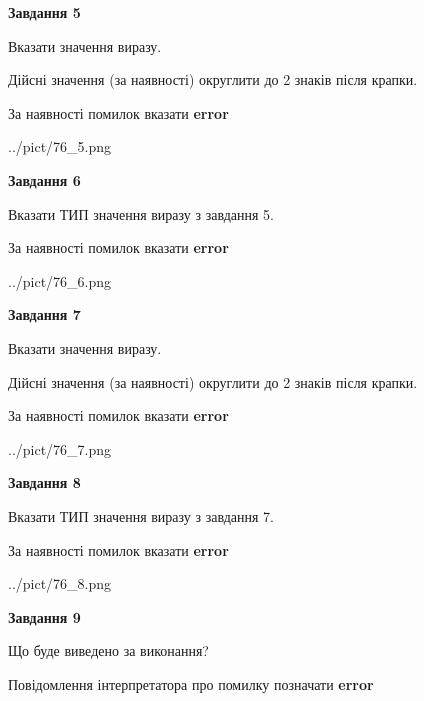 \documentclass[11pt, ukrainian]{article}
\begin{document}
{\begin {large}
{\begin {center}\textbf{Завдання 5}\end {center}}\par
Вказати значення виразу. \par
Дійсні значення (за наявності) округлити до 2 знаків після крапки. \par
За наявності помилок вказати \textbf{error}

\begin{center}
	{../pict/76_5.png}
\end{center}
\newpage

{\begin {center}\textbf{Завдання 6}\end {center}}\par
Вказати ТИП значення виразу з завдання 5. \par
За наявності помилок вказати \textbf{error}

\begin{center}
	{../pict/76_6.png}
\end{center}
\newpage

{\begin {center}\textbf{Завдання 7}\end {center}}\par
Вказати значення виразу. \par
Дійсні значення (за наявності) округлити до 2 знаків після крапки. \par
За наявності помилок вказати \textbf{error}

\begin{center}
	{../pict/76_7.png}
\end{center}
\newpage

{\begin {center}\textbf{Завдання 8}\end {center}}\par
Вказати ТИП значення виразу з завдання 7. \par
За наявності помилок вказати \textbf{error}

\begin{center}
	{../pict/76_8.png}
\end{center}
\newpage

{\begin {center}\textbf{Завдання 9}\end {center}}\par
Що буде виведено за виконання? \par
Повідомлення інтерпретатора про помилку позначати \textbf{error}


\end{large}}
\end{document}
